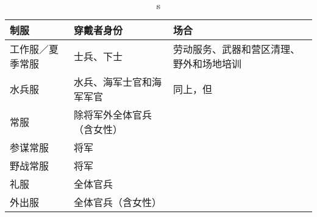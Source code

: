 \begin{table}[!ht]
    \centering
    \caption{s}
    \begin{tabular}{lll}
    \hline
    制服 & 穿戴者身份 & 场合 \\ \hline
    工作服／夏季常服 & 士兵、下士 & 劳动服务、武器和营区清理、野外和场地培训 \\ 
    水兵服 & 水兵、海军士官和海军军官 & 同上，但 \\ 
    常服 & 除将军外全体官兵（含女性） & ~ \\ 
    参谋常服 & 将军 & ~ \\ 
    野战常服 & 将军 & ~ \\ 
    礼服 & 全体官兵 & ~ \\ 
    外出服 & 全体官兵（含女性） & ~ \\ \hline
    \end{tabular}
    \label{Table 1}
\end{table}